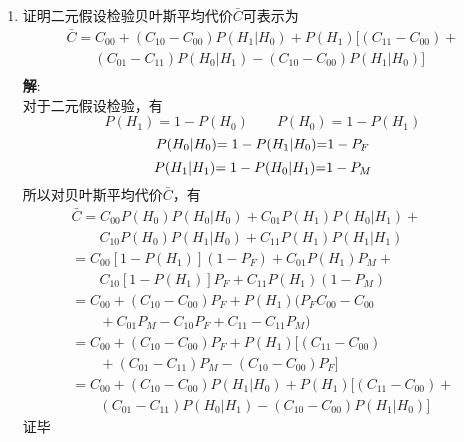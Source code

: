 \documentclass{article}
\begin{document}
\begin{enumerate}[1.]
\begin{enumerate}[(1)]
\end{enumerate}

\item
证明二元假设检验贝叶斯平均代价\(\bar C\)可表示为
\[\begin{array}{l}
\bar C = {C_{00}} + ({C_{10}} - {C_{00}})P({H_1}|{H_0}) + P({H_1})[({C_{11}} - {C_{00}}) + \\
\qquad({C_{01}} - {C_{11}})P({H_0}|{H_1}) - ({C_{10}} - {C_{00}})P({H_1}|{H_0})]\\
\end{array}\]
\textbf{解}:\\
对于二元假设检验，有
\[P({H_1}) = 1 - P({H_0})\qquad P({H_0}) = 1 - P({H_1})\]
\[P({H_0}|{H_0}){\rm{ = 1}} - P({H_1}|{H_0}){\rm{ = }}1 - {P_F}\]
\[P({H_1}|{H_1}){\rm{ = 1}} - P({H_0}|{H_1}){\rm{ = }}1 - {P_M}\]
所以对贝叶斯平均代价\(\bar C\)，有
\[\begin{array}{l}
{\bar C}
 = {C_{00}}P({H_0})P({H_0}|{H_0}) + {C_{01}}P({H_1})P({H_0}|{H_1}) + \\
\qquad{C_{10}}P({H_0})P({H_1}|{H_0}) + {C_{11}}P({H_1})P({H_1}|{H_1})\\
 = {C_{00}}[1 - P({H_1})](1 - {P_F}) + {C_{01}}P({H_1}){P_M} + \\
\qquad{C_{10}}[1 - P({H_1})]{P_F} + {C_{11}}P({H_1})(1 - {P_M})\\
 = {C_{00}} + ({C_{10}} - {C_{00}}){P_F} + P({H_1})({P_F}{C_{00}} - {C_{00}}\\
 \qquad + {C_{01}}{P_M} - {C_{10}}{P_F} + {C_{11}} - {C_{11}}{P_M})\\
 = {C_{00}} + ({C_{10}} - {C_{00}}){P_F} + P({H_1})[({C_{11}} - {C_{00}}) \\
 \qquad+ ({C_{01}} - {C_{11}}){P_M} - ({C_{10}} - {C_{00}}){P_F}]\\
 = {C_{00}} + ({C_{10}} - {C_{00}})P({H_1}|{H_0}) + P({H_1})[({C_{11}} - {C_{00}}) + \\
 \qquad({C_{01}} - {C_{11}})P({H_0}|{H_1}) - ({C_{10}} - {C_{00}})P({H_1}|{H_0})]
\end{array}\]
证毕


\end{enumerate}
\end{document}
